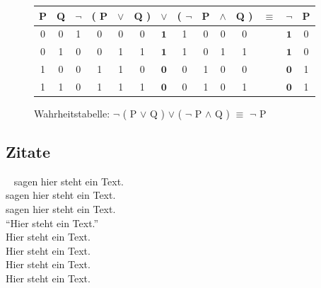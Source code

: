 \begin{figure}[!ht]
    \begin{center}
        \begin{tabular}{|c|c||c|c|c|c|c|c|c|c|c||c||c|c|}
            \hline
            P & Q & $\neg$ & ( P & $\vee$ & Q ) & $\vee$       & ( $\neg$ & P & $\wedge$ & Q ) & $\equiv$ & $\neg$       & P \\ \hline \hline
            0 & 0 & 1      & 0   & 0      & 0   & $\mathbf{1}$ & 1        & 0 & 0        & 0   &          & $\mathbf{1}$ & 0 \\ \hline
            0 & 1 & 0      & 0   & 1      & 1   & $\mathbf{1}$ & 1        & 0 & 1        & 1   &          & $\mathbf{1}$ & 0 \\ \hline
            1 & 0 & 0      & 1   & 1      & 0   & $\mathbf{0}$ & 0        & 1 & 0        & 0   &          & $\mathbf{0}$ & 1 \\ \hline
            1 & 1 & 0      & 1   & 1      & 1   & $\mathbf{0}$ & 0        & 1 & 0        & 1   &          & $\mathbf{0}$ & 1 \\ \hline
        \end{tabular}
        \caption{Wahrheitstabelle: $\neg$ ( P $\vee$ Q ) $\vee$ ( $\neg$ P $\wedge$ Q ) $\equiv$ $\neg$ P}\label{fig:figureFormulaTable}
    \end{center}
\end{figure}


\subsection{Zitate}\label{subsec:zitate}~\cite{BarAhl08} sagen hier steht ein Text. \\
\textcite{BruMurPerWygMcN09} sagen hier steht ein Text. \\
\textcite*{BruMurPerWygMcN09} sagen hier steht ein Text. \\
"`Hier steht ein Text."'~\autocite{BarAhl08} \\
Hier steht ein Text.~\autocite[Vgl.][]{BarAhl08} \\
Hier steht ein Text.~\autocite[][S. 200]{BruMurPerWygMcN09} \\
Hier steht ein Text.~\autocite*[][S. 200]{BruMurPerWygMcN09} \\
Hier steht ein Text.~\autocite{wiki:001,BruMurPerWygMcN09} \\

